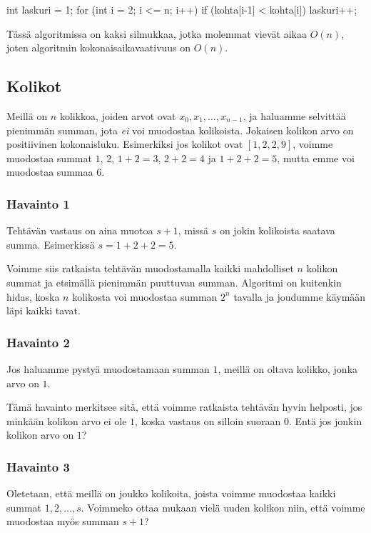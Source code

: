 \begin{code}
int laskuri = 1;
for (int i = 2; i <= n; i++) {
    if (kohta[i-1] < kohta[i]) {
        laskuri++;
    }
}
\end{code}

Tässä algoritmissa on kaksi silmukkaa, jotka molemmat
vievät aikaa $O(n)$, joten algoritmin kokonaisaikavaativuus on $O(n)$.

\subsection{Kolikot}

Meillä on $n$ kolikkoa, joiden arvot ovat $x_0,x_1,\dots,x_{n-1}$,
ja haluamme selvittää pienimmän summan, jota \emph{ei} voi muodostaa kolikoista.
Jokaisen kolikon arvo on positiivinen kokonaisluku.
Esimerkiksi jos kolikot ovat $[1,2,2,9]$, voimme muodostaa summat
$1$, $2$, $1+2=3$, $2+2=4$ ja $1+2+2=5$,
mutta emme voi muodostaa summaa $6$.

\subsubsection{Havainto 1}

Tehtävän vastaus on aina muotoa $s+1$, missä $s$ on jokin kolikoista
saatava summa. Esimerkissä $s=1+2+2=5$.

Voimme siis ratkaista tehtävän
muodostamalla kaikki mahdolliset $n$ kolikon summat
ja etsimällä pienimmän puuttuvan summan.
Algoritmi on kuitenkin hidas, koska $n$ kolikosta voi
muodostaa summan $2^n$ tavalla ja joudumme käymään läpi kaikki tavat.

\subsubsection{Havainto 2}

Jos haluamme pystyä muodostamaan summan $1$,
meillä on oltava kolikko, jonka arvo on $1$.

Tämä havainto merkitsee sitä, että voimme ratkaista tehtävän
hyvin helposti, jos minkään kolikon arvo ei ole $1$,
koska vastaus on silloin suoraan $0$.
Entä jos jonkin kolikon arvo on $1$?

\subsubsection{Havainto 3}

Oletetaan, että meillä on joukko kolikoita,
joista voimme muodostaa kaikki summat $1,2,\dots,s$.
Voimmeko ottaa mukaan vielä uuden kolikon niin,
että voimme muodostaa myös summan $s+1$?

